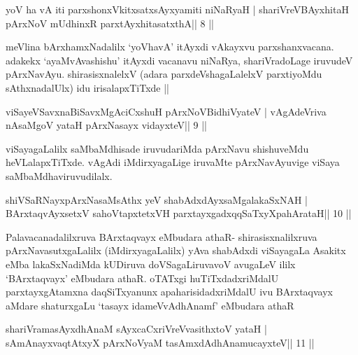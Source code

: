
\begin{shl}
yoV ha vA iti parxshonxVkitxsatxsAyxyamiti niNaRyaH |
shariVreV\s BAyxhitaH pArxNoV mUdhinxR parxtAyxhitasatxthA\hfill || 8 ||
\end{shl}

\begin{artha}
meVlina bArxhamxNadalilx `yoVhavA' itAyxdi vAkayxvu parxshanxvacana.
adakekx `ayaMvAvashishu' itAyxdi vacanavu niNaRya, shariVradoLage
iruvudeV pArxNavAyu. shirasisxnalelxV (adara parxdeVshagaLalelxV
parxtiyoMdu sAthxnadalUlx) idu irisalapxTiTxde ||
\end{artha}

\begin{shl}
viSayeVSavxnaBiSavxMgAciCxshuH  pArxNoV\s BidhiVyateV |
vAgAdeVriva nA\s\s saMgoV yataH pArxNasayx vidayxteV\hfill || 9 ||
\end{shl}

\begin{artha}
viSayagaLalilx saMbaMdhisade iruvudariMda pArxNavu shishuveMdu heVLalapxTiTxde. vAgAdi iMdirxyagaLige iruvaMte pArxNavAyuvige viSaya saMbaMdhaviruvudilalx.
\end{artha}

\begin{shl}
shiVSaRNayxpArxNasaMsAthx yeV shabAdxdAyxsaMgalakaSxNAH |
BArxtaqvAyxsetxV sahoVtapxtetxVH parxtayxgadxqqSaTxyXpahArataH\hfill || 10 ||
\end{shl}

\begin{artha}
Palavacanadalilxruva BArxtaqvayx eMbudara athaR- shirasisxnalilxruva
pArxNavasutxgaLalilx (iMdirxyagaLalilx) yAva shabAdxdi viSayagaLa
Asakitx eMba lakaSxNadiMda kUDiruva doVSagaLiruvavoV avugaLeV ililx
`BArxtaqvayx' eMbudara athaR. oTATxgi huTiTxdadxriMdalU
parxtayxgAtamxna daqSiTxyanunx apaharisidadxriMdalU ivu BArxtaqvayx
aMdare shaturxgaLu `tasayx idameVvA\s\s dhAnamf' eMbudara athaR
\end{artha}

\begin{shl}
shariVramasAyx\s\s dhAnaM sAyxcaCxriVreV\s vasithxtoV yataH |
sAmAnayxvaqtAtxyX pArxNoV\s yaM tasAmxdAdhAnamucayxteV\hfill || 11 ||
\end{shl}

